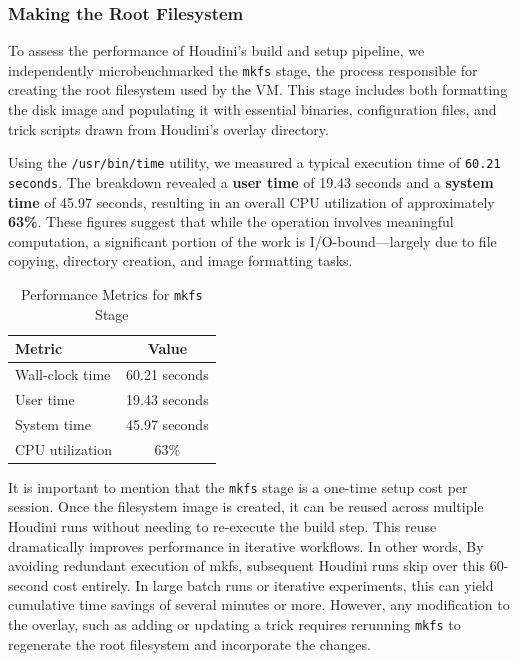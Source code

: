 \documentclass[12pt]{report}
\begin{document}
\begin{doublespace}
\subsubsection{Making the Root Filesystem}

To assess the performance of Houdini’s build and setup pipeline, we independently microbenchmarked the \texttt{mkfs} stage, the process responsible for creating the root filesystem used by the VM. This stage includes both formatting the disk image and populating it with essential binaries, configuration files, and trick scripts drawn from Houdini’s overlay directory.

Using the \texttt{/usr/bin/time} utility, we measured a typical execution time of \texttt{60.21 seconds}. The breakdown revealed a \textbf{user time} of 19.43 seconds and a \textbf{system time} of 45.97 seconds, resulting in an overall CPU utilization of approximately \textbf{63\%}. These figures suggest that while the operation involves meaningful computation, a significant portion of the work is I/O-bound—largely due to file copying, directory creation, and image formatting tasks.

\begin{table}[h]
\centering
\caption{Performance Metrics for \texttt{mkfs} Stage}
\label{tab:mkfs-performance}
\begin{tabular}{|l|c|}
\hline
\textbf{Metric}         & \textbf{Value} \\
\hline
Wall-clock time         & 60.21 seconds \\
User time               & 19.43 seconds \\
System time             & 45.97 seconds \\
CPU utilization         & 63\% \\
\hline
\end{tabular}
\end{table}


It is important to mention that the \texttt{mkfs} stage is a one-time setup cost per session. Once the filesystem image is created, it can be reused across multiple Houdini runs without needing to re-execute the build step. This reuse dramatically improves performance in iterative workflows. In other words, By avoiding redundant execution of mkfs, subsequent Houdini runs skip over this 60-second cost entirely. In large batch runs or iterative experiments, this can yield cumulative time savings of several minutes or more. However, any modification to the overlay, such as adding or updating a trick requires rerunning \texttt{mkfs} to regenerate the root filesystem and incorporate the changes.



\end{doublespace}
\end{document}

